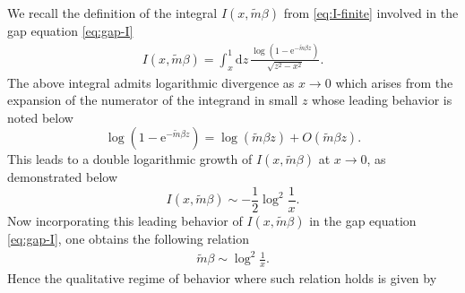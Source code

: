 \documentclass[a4paper,11pt]{article}
\newcommand{\e}{\mathrm e}
\newcommand{\dd}{\mathrm d}
\newcommand{\Order}{\mathcal O}
\begin{document}
We recall the definition of the integral $I(x,\tilde m\beta)$ from \eqref{eq:I-finite} involved in the gap equation \eqref{eq:gap-I}
\begin{align}\label{I integral}
 I(x,\tilde m\beta)=\int_x^1\dd z\,
 \frac{\log(1-\e^{-\tilde m\beta z})}{\sqrt{z^2-x^2}}.
\end{align}
The above  integral admits logarithmic divergence as $x\to 0$ which arises from the expansion of the numerator of the integrand in small $z$ whose leading behavior is noted below
\begin{equation}
	\log(1-\e^{-\tilde m\beta z})
	=\log(\tilde m\beta z)+O(\tilde m \beta z).
	\label{eq:bernoulli-expansion1}
\end{equation}
This leads to a double logarithmic growth of $I(x,\tilde m\beta)$ at $x\to0$, as demonstrated below
%
\begin{equation}
 I(x,\tilde m\beta)\sim
 -\frac12\log^2\!\frac1x.
\end{equation}
Now incorporating this leading behavior of $I(x,\tilde m\beta )$ in the gap equation \eqref{eq:gap-I}, one obtains the following relation
\begin{align}\label{sim gap}
	\tilde m\beta\sim
	\log^2\!\frac1x.
\end{align}
Hence the qualitative regime of behavior  where such relation holds is given by 
\end{document}
